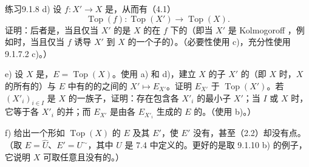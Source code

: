 \begin{SGAresult}{练习}{9.1.8}
d) 设 $f:X'\to X$ 是，从而有（4.1）
\[
\operatorname{Top}(f):\operatorname{Top}(X')\longrightarrow\operatorname{Top}(X).
\]
证明：后者是，当且仅当 $X'$ 的是 $X$ 的在 $f$ 下的（即当 $X'$ 是 Kolmogoroff ，例如时，当且仅当 $f$ 诱导 $X'$ 到 $X$ 的一个子的）。（必要性使用 c)，充分性使用 9.1.7.2 c)。）

e) 设 $X$ 是，$E=\operatorname{Top}(X)$。使用 a) 和 d)，建立 $X$ 的子 $X'$ 的（即 $X$ 时，$X$ 的所有的）与 $E$ 中有的的之间的 $X'\mapsto E_{X'}$。证明 $E_{X'}$ 于 $\operatorname{Top}(X')$。若 $(X'_i)_{i\in I}$ 是 $X$ 的一族子，证明：存在包含各 $X'_i$ 的最小子 $X'$；当 $I$ 或 $X$ 时，它等于各 $X'_i$ 的并；而 $E_{X'}$ 是由各 $E_{X'_i}$ 生成的 $E$ 的。（使用 b)。）

f) 给出一个形如 $\operatorname{Top}(X)$ 的 $E$ 及其 $E'$，使 $E'$ 没有，甚至（2.2）却没有点。（取 $E=\widehat U$、$E'=U^\sim$，其中 $U$ 是 7.4 中定义的。更好的是取 9.1.10 b) 的例子，它说明 $X$ 可取任意且没有的。）
\end{SGAresult}
